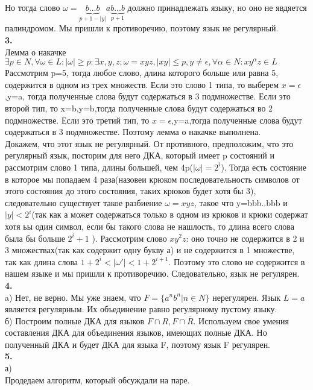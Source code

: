 \documentclass[a4paper,12pt]{article}
\begin{document}
Но тогда слово $\omega=\underbrace{b...b}_{p+1-|y|} a \underbrace{b...b}_{p+1}$ должно принадлежать языку, но оно не явдяется палиндромом. Мы пришли к противоречию, поэтому язык не регулярный.\\
\textbf{3.}\\
Лемма о накачке\\
$\exists p\in N ,\forall \omega \in L:|\omega|\geq p: \exists x,y,z; \omega=xyz, |xy|\leq  p, y\neq\epsilon, \forall \alpha \in N: xy^\alpha z\in L $
Рассмотрим p=5, тогда любое слово, длина которого больше или равна 5, содержится в одном из трех множеств. Если это слово 1 типа, то выберем $x=\epsilon$,y=a, тогда полученные слова будут содержаться в 3 подмножестве. Если это второй тип, то  x=b,y=b,тогда полученные слова будут содержаться во 2 подмножестве. Если это третий тип, то  $x=\epsilon$,y=a,тогда полученные слова будут содержаться в 3  подмножестве. 
Поэтому лемма о накачке выполнена.\\
Докажем, что этот язык не регулярный. От противного, предположим, что это регулярный язык, посторим для него ДКА, который имеет p состояний и рассмотрим слово 1 типа, длины большей, чем 4p($|\omega|=2^i$). Тогда есть состояние в которое мы попадаем 4 раза(назовеи крюком последовательность символов от этого состояния до этого состояния, таких крюков будет хотя бы 3), следовательно существует такое разбиение $\omega=xyz$, такое что y=bbb..bbb и $|y|<2^i$(так как а может содержаться только в одном из крюков и крюки содержат хотя ьы один символ, если бы такого слова не нашлость, то длина всего слова была бы больше $2^i+1$ ). Рассмотрим слово $xy^2z$: оно точно не содержится в 2 и 3 множествах(так как содержит одну букву а) и не содержится в 1 множестве, так как длина слова $1+2^i<|\omega'|<1+2^{i+1}$. Поэтому это слово не содержится в нашем языке и мы пришли к противоречию. Следовательно, язык не регулярен.\\
\textbf{4.}\\
a) Нет, не верно. Мы уже знаем, что $F=\lbrace a^nb^n | n \in N \rbrace$ нерегулярен. Язык $L={a}$ является регулярным. Их объединение равно регулярному пустому языку.\\
б) Построим полные ДКА для языков $F\cap R, F\cap \overline{R}$. Используем свое умения составления ДКА для объединения языков, имеющих полные ДКА. Но полученный ДКА и будет ДКА для языка F, поэтому язык F регулярен.\\
\textbf{5.}\\
а)\\
Продедаем алгоритм, который обсуждали на паре.\\
\end{document}
